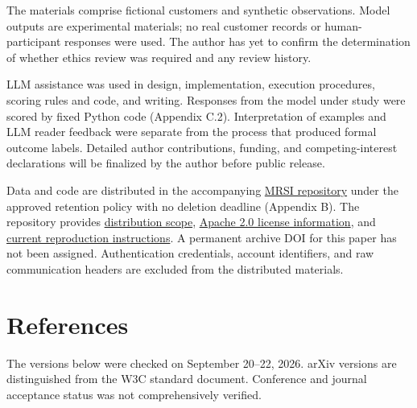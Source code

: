 \documentclass[10pt,a4paper]{article}
\begin{document}
The materials comprise fictional customers and synthetic observations. Model outputs are experimental materials; no real customer records or human-participant responses were used. The author has yet to confirm the determination of whether ethics review was required and any review history.

LLM assistance was used in design, implementation, execution procedures, scoring rules and code, and writing. Responses from the model under study were scored by fixed Python code (Appendix C.2). Interpretation of examples and LLM reader feedback were separate from the process that produced formal outcome labels. Detailed author contributions, funding, and competing-interest declarations will be finalized by the author before public release.

Data and code are distributed in the accompanying \href{https://github.com/metaSATOKEN/MRSI}{MRSI repository} under the approved retention policy with no deletion deadline (Appendix B). The repository provides \href{https://github.com/metaSATOKEN/MRSI/blob/9443de315d283874df0c27e0e99b8c04f400709d/PUBLICATION_SCOPE.md}{distribution scope}, \href{https://github.com/metaSATOKEN/MRSI/blob/9443de315d283874df0c27e0e99b8c04f400709d/LICENSE_STATUS.md}{Apache 2.0 license information}, and \href{https://github.com/metaSATOKEN/MRSI/blob/9443de315d283874df0c27e0e99b8c04f400709d/RUNNING.md}{current reproduction instructions}. A permanent archive DOI for this paper has not been assigned. Authentication credentials, account identifiers, and raw communication headers are excluded from the distributed materials.

\clearpage

\begingroup\raggedright

\section{References}\label{paper-01-references}

The versions below were checked on September 20--22, 2026. arXiv versions are distinguished from the W3C standard document. Conference and journal acceptance status was not comprehensively verified.
\end{document}
